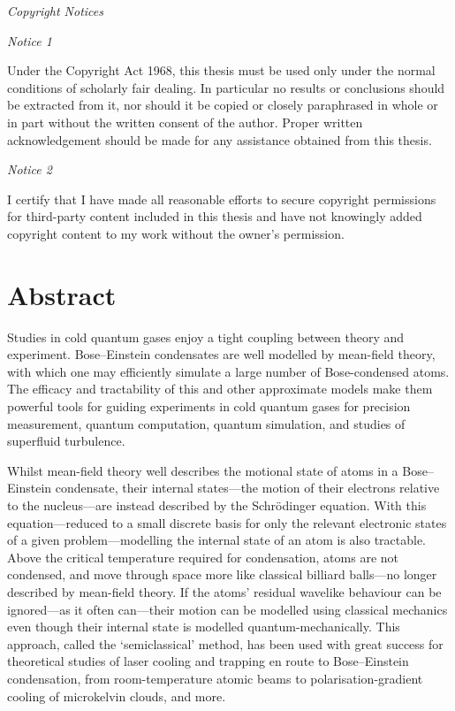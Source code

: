 \begin{center}
\begin{minipage}{0.95\textwidth}

\begin{center}
\textit{Copyright Notices}
\end{center}

{\textit{Notice 1}}

Under the Copyright Act 1968, this thesis must be used only under the normal conditions of scholarly fair dealing.
In particular no results or conclusions should be extracted from it, nor should it be copied or closely paraphrased in whole or in part without the written consent of the author.
Proper written acknowledgement should be made for any assistance obtained from this thesis.

\bigskip

{\textit {Notice 2}}

I certify that I have made all reasonable efforts to secure copyright permissions for third-party content included in this thesis and have not knowingly added copyright content to my work without the owner's permission.

\end{minipage}
\end{center}

\vspace*{\fill}
\vspace*{\fill}

\chapter*{Abstract}

Studies in cold quantum gases enjoy a tight coupling between theory and experiment. Bose--Einstein condensates are well modelled by mean-field theory, with which one may efficiently simulate a large number of Bose-condensed atoms. The efficacy and tractability of this and other approximate models make them powerful tools for guiding experiments in cold quantum gases for precision measurement, quantum computation, quantum simulation, and studies of superfluid turbulence.

Whilst mean-field theory well describes the motional state of atoms in a Bose--Einstein condensate, their internal states---the motion of their electrons relative to the nucleus---are instead described by the Schr\"odinger equation. With this equation---reduced to a small discrete basis for only the relevant electronic states of a given problem---modelling the internal state of an atom is also tractable. Above the critical temperature required for condensation, atoms are not condensed, and move through space more like classical billiard balls---no longer described by mean-field theory. If the atoms' residual wavelike behaviour can be ignored---as it often can---their motion can be modelled using classical mechanics even though their internal state is modelled quantum-mechanically. This approach, called the `semiclassical' method, has been used with great success for theoretical studies of laser cooling and trapping en route to Bose--Einstein condensation, from room-temperature atomic beams to polarisation-gradient cooling of microkelvin clouds, and more.

